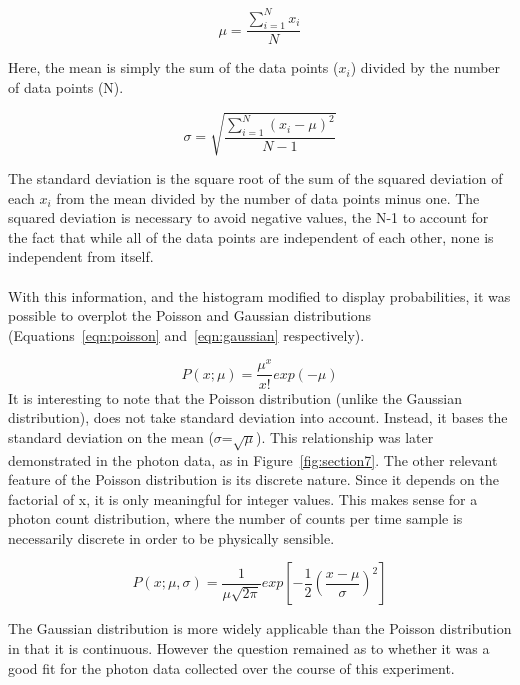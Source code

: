 \documentclass[a4paper,12pt]{article}
\begin{document}
\begin{equation}
\label{eqn:mean}
\mu = \frac{\sum_{i=1}^{N}{x_i}}{N}
\end{equation}

Here, the mean is simply the sum of the data points ($x_i$) divided by the number of data points (N).

\begin{equation}
\label{eqn:standard deviation}
\sigma = \sqrt{\frac{\sum_{i=1}^{N}(x_i-\mu)^2}{N-1}}
\end{equation}

The standard deviation is the square root of the sum of the squared deviation of each $x_i$ from the mean divided by the number of data points minus one. The squared deviation is necessary to avoid negative values, the N-1 to account for the fact that while all of the data points are independent of each other, none is independent from itself.
\\
\\
With this information, and the histogram modified to display probabilities, it was possible to overplot the Poisson and Gaussian distributions (Equations~\ref{eqn:poisson} and~\ref{eqn:gaussian} respectively).

\begin{equation}
\label{eqn:poisson}
P(x;\mu) = \frac{\mu^x}{x!}exp(-\mu)
\end{equation}
It is interesting to note that the Poisson distribution (unlike the Gaussian distribution), does not take standard deviation into account. Instead, it bases the standard deviation on the mean ($\sigma$=$\sqrt{\mu}$). This relationship was later demonstrated in the photon data, as in Figure~\ref{fig:section7}. The other relevant feature of the Poisson distribution is its discrete nature. Since it depends on the factorial of x, it is only meaningful for integer values. This makes sense for a photon count distribution, where the number of counts per time sample is necessarily discrete in order to be physically sensible.

\begin{equation}
\label{eqn:gaussian}
P(x;\mu,\sigma) = \frac{1}{\mu\sqrt{2\pi}}exp[-\frac{1}{2}(\frac{x-\mu}{\sigma})^2]
\end{equation}

The Gaussian distribution is more widely applicable than the Poisson distribution in that it is continuous. However the question remained as to whether it was a good fit for the photon data collected over the course of this experiment.
\end{document}
